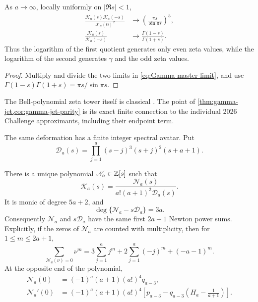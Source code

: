 \begin{corollary}
\label{cor:gamma-jet-parity}
As \(a\to\infty\), locally uniformly on \(|\Re s|<1\),
\begin{align}
 \frac{\mathscr K_a(s)\mathscr K_a(-s)}{\mathscr K_a(0)^2}
 &\longrightarrow
 \left(\frac{\pi s}{\sin\pi s}\right)^5,
 \label{eq:even-jet-limit}\\
 \frac{\mathscr K_a(s)}{\mathscr K_a(-s)}
 &\longrightarrow\frac{\Gamma(1-s)}{\Gamma(1+s)}.
 \label{eq:odd-jet-limit}
\end{align}
Thus the logarithm of the first quotient generates only even zeta values,
while the logarithm of the second generates \(\gamma\) and the odd zeta
values.
\end{corollary}

\begin{proof}
Multiply and divide the two limits in \eqref{eq:Gamma-master-limit}, and use
\(\Gamma(1-s)\Gamma(1+s)=\pi s/\sin\pi s\).
\end{proof}

The Bell-polynomial zeta tower itself is classical
\cite{PilehroodBell2012}.  The point of
\cref{thm:gamma-jet,cor:gamma-jet-parity} is its exact finite connection to
the individual 2026 Challenge approximants, including their endpoint term.

The same deformation has a finite integer spectral avatar.  Put
\begin{equation}\label{eq:contact-denominator}
 \mathscr D_a(s)=
 \prod_{j=1}^a(s-j)^3(s+j)^2(s+a+1).
\end{equation}

\begin{theorem}
\label{thm:contact-polynomial}
There is a unique polynomial \(\mathscr N_a\in\mathbb Z[s]\) such that
\begin{equation}\label{eq:contact-rational-form}
 \mathscr K_a(s)=
 \frac{\mathscr N_a(s)}{a!(a+1)^2\mathscr D_a(s)}.
\end{equation}
It is monic of degree \(5a+2\), and
\begin{equation}\label{eq:contact-degree}
 \deg\{\mathscr N_a-s\mathscr D_a\}=3a.
\end{equation}
Consequently \(\mathscr N_a\) and \(s\mathscr D_a\) have the same first
\(2a+1\) Newton power sums.  Explicitly, if the zeros of
\(\mathscr N_a\) are counted with multiplicity, then for
\(1\le m\le2a+1\),
\begin{equation}\label{eq:contact-Newton}
 \sum_{\mathscr N_a(\nu)=0}\nu^m
 =3\sum_{j=1}^aj^m+2\sum_{j=1}^a(-j)^m+(-a-1)^m.
\end{equation}
At the opposite end of the polynomial,
\begin{align}
 \mathscr N_a(0)
 &=(-1)^a(a+1)(a!)^4q_{a-3},
 \label{eq:contact-N0}\\
 \mathscr N_a'(0)
 &=(-1)^a(a+1)(a!)^4
 \left[p_{a-3}-q_{a-3}\left(H_a-\frac1{a+1}\right)\right].
 \label{eq:contact-N1}
\end{align}
\end{theorem}

